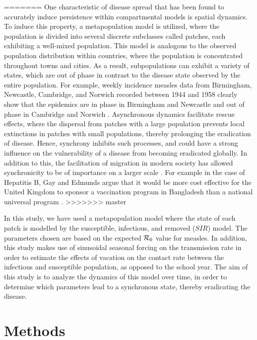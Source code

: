 \documentclass[twocolumn,nofootinbib,showkeys,twoside,floatfix,unsortedaddress,flushbottom,10pt,aps,pra]{report}
\begin{document}
=======
One characteristic of disease spread that has been found to accurately induce persistence within compartmental models is spatial dynamics. To induce this property, a metapopulation model is utilized, where the population is divided into several discrete subclasses called patches, each exhibiting a well-mixed population. This model is analogous to the observed population distribution within countries, where the population is concentrated throughout towns and cities. As a result, subpopulations can exhibit a variety of states, which are out of phase in contrast to the disease state observed by the entire population. For example, weekly incidence measles data from Birmingham, Newcastle, Cambridge, and Norwich recorded between 1944 and 1958 clearly show that the epidemics are in phase in Birmingham and Newcastle and out of phase in Cambridge and Norwich \cite{Grenfell2001}. Asynchronous dynamics facilitate rescue effects, where the dispersal from patches with a large population prevents local extinctions in patches with small populations, thereby prolonging the eradication of disease. Hence, synchrony inhibits such processes, and could have a strong influence on the vulnerability of a disease from becoming eradicated globally. In addition to this, the facilitation of migration in modern society has allowed synchronicity to be of importance on a larger scale \cite{McCluskey2011}. For example in the case of Hepatitis B, Gay and Edmunds argue that it would be more cost effective for the United Kingdom to sponsor a vaccination program in Bangladesh than a national universal program \cite{Burton2012}. 
>>>>>>> master
\par
\smallskip \qquad
In this study, we have used a metapopulation model where the state of each patch is modelled by the susceptible, infectious, and removed ($SIR$) model. The parameters chosen are based on the expected ${\cal R}_0$ value for measles. In addition, this study makes use of sinusoidal seasonal forcing on the transmission rate in order to estimate the effects of vacation on the contact rate between the infectious and susceptible population, as opposed to the school year. The aim of this study is to analyze the dynamics of this model over time, in order to determine which parameters lead to a synchronous state, thereby eradicating the disease. \par
\smallskip

\section{Methods}
\end{document}
